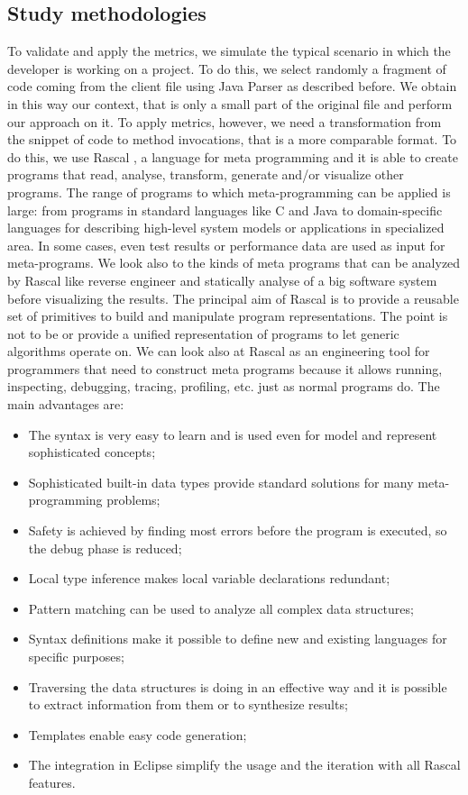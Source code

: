 \subsection{Study methodologies}
To validate and apply the metrics, we simulate the typical scenario in which the developer is working on a project. To do this, we select randomly a fragment of code coming from the client file using Java Parser as described before. We obtain in this way our context, that is only a small part of the original file and perform our approach on it. To apply metrics, however, we need a transformation from the snippet of code to method invocations, that is a more comparable format. To do this, we use Rascal \cite{utor.rascal-mpl.org/_last_nodate}, a language for meta programming and it is able to create programs that read, analyse, transform, generate and/or visualize other programs. The range of programs to which meta-programming can be applied is large: from programs in standard languages like C and Java to domain-specific languages for describing high-level system models or applications in specialized area. In some cases, even test results or performance data are used as input for meta-programs. We look also to the kinds of meta programs that can be analyzed by Rascal like reverse engineer and statically analyse of a big software system before visualizing the results. The principal aim of Rascal is to provide a reusable set of primitives to build and manipulate program representations. The point is not to be or provide a unified representation of programs to let generic algorithms operate on.  
We can look also at Rascal as an engineering tool for programmers that need to construct meta programs because it allows running, inspecting, debugging, tracing, profiling, etc. just as normal programs do. The main advantages are:
\begin{itemize}
\item The syntax is very easy to learn and is used even for model and represent sophisticated concepts;
\item Sophisticated built-in data types provide standard solutions for many meta-programming problems;
\item Safety is achieved by finding most errors before the program is executed, so the debug phase is reduced;
\item Local type inference makes local variable declarations redundant;
\item Pattern matching can be used to analyze all complex data structures;
\item Syntax definitions make it possible to define new and existing languages for specific purposes;
\item Traversing the data structures is doing in an effective way and it is possible to extract information from them or to synthesize results;
\item Templates enable easy code generation;
\item The integration in Eclipse simplify the usage and the iteration with all Rascal features.
\end{itemize}
